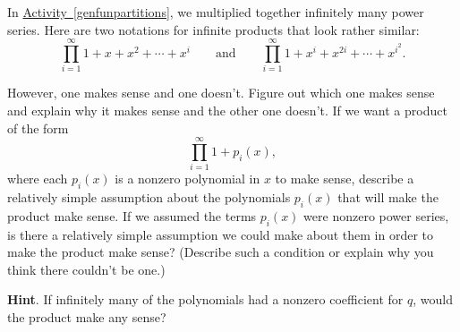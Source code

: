 \documentclass{book}
\begin{document}
\setcounter{cpjt}{320}
\addtocounter{cpjt}{-1}
\begin{activity}\label{activity-313}
\hypertarget{p-1591}{}%
In \hyperref[genfunpartitions]{Activity~\ref{genfunpartitions}}, we multiplied together infinitely many power series. Here are two notations for infinite products that look rather similar:%
\begin{equation*}
\prod_{i=1}^\infty 1 + x + x^2 +\cdots+ x^i\qquad\mbox{and}\qquad
\prod_{i=1}^\infty 1 +x^i +x^{2i} +\cdots + x^{i^2}.
\end{equation*}
%
\par
\hypertarget{p-1592}{}%
However, one makes sense and one doesn't. Figure out which one makes sense and explain why it makes sense and the other one doesn't. If we want a product of the form%
\begin{equation*}
\prod_{i=1}^\infty 1 +p_i(x),
\end{equation*}
where each \(p_i(x)\) is a nonzero polynomial in \(x\) to make sense, describe a relatively simple assumption about the polynomials \(p_i(x)\) that will make the product make sense. If we assumed the terms \(p_i(x)\) were nonzero power series, is there a relatively simple assumption we could make about them in order to make the product make sense? (Describe such a condition or explain why you think there couldn't be one.)%
\par\smallskip%
\noindent\textbf{Hint}.\hypertarget{hint-211}{}\quad%
\hypertarget{p-1593}{}%
If infinitely many of the polynomials had a nonzero coefficient for \(q\), would the product make any sense?%
\par\smallskip%
\noindent\end{activity}

\clearpage
\end{document}
